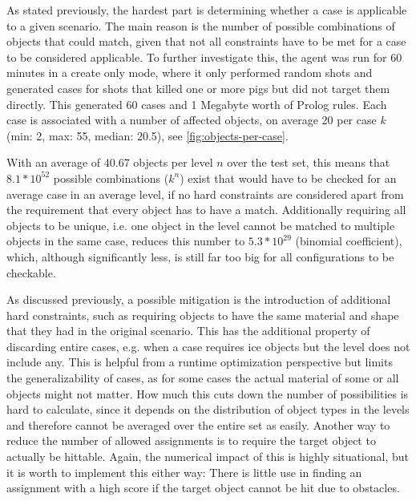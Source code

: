 As stated previously, the hardest part is determining whether a case is applicable to a given scenario.
The main reason is the number of possible combinations of objects that could match, given that not all constraints have to be met for a case to be considered applicable.
To further investigate this, the agent was run for 60 minutes in a create only mode, where it only performed random shots and generated cases for shots that killed one or more pigs but did not target them directly.
This generated 60 cases and 1 Megabyte worth of Prolog rules. Each case is associated with a number of affected objects, on average 20 per case $k$ (min: 2, max: 55, median: 20.5), see \ref{fig:objects-per-case}.

With an average of 40.67 objects per level $n$ over the test set, this means that
$8.1*10^52$ possible combinations ($k^n$) exist that would have to be checked for an average case in an average level, if no hard constraints are considered apart from the requirement that every object has to have a match.
Additionally requiring all objects to be unique, i.e. one object in the level cannot be matched to multiple objects in the same case, reduces this number to
$5.3*10^29$ (binomial coefficient), which, although significantly less, is still far too big for all configurations to be checkable.


As discussed previously, a possible mitigation is the introduction of additional hard constraints, such as requiring objects to have the same material and shape that they had in the original scenario.
This has the additional property of discarding entire cases, e.g. when a case requires ice objects but the level does not include any.
This is helpful from a runtime optimization perspective but limits the generalizability of cases, as for some cases the actual material of some or all objects might not matter.
How much this cuts down the number of possibilities is hard to calculate, since it depends on the distribution of object types in the levels and therefore cannot be averaged over the entire set as easily.
Another way to reduce the number of allowed assignments is to require the target object to actually be hittable.
Again, the numerical impact of this is highly situational, but it is worth to implement this either way:
There is little use in finding an assignment with a high score if the target object cannot be hit due to obstacles.


